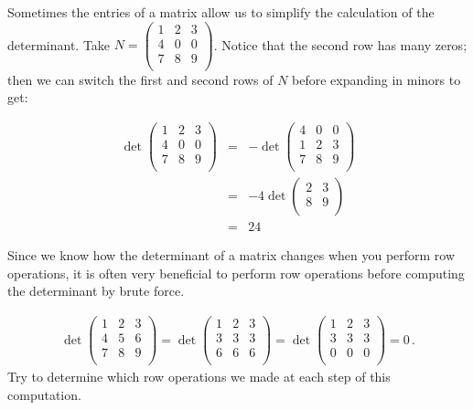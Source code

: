 \begin{example}
Sometimes the entries of a matrix allow us to simplify the calculation of the determinant.  Take $N= \begin{pmatrix}
1 & 2 & 3 \\
4 & 0 & 0 \\
7 & 8 & 9 \\
\end{pmatrix}$.  Notice that the second row has many zeros; then we can switch the first and second rows of $N$ before expanding in minors to get:

\begin{eqnarray*}
\det \begin{pmatrix}
1 & 2 & 3 \\
4 & 0 & 0 \\
7 & 8 & 9 \\
\end{pmatrix} & = & -\det \begin{pmatrix}
4 & 0 & 0 \\
1 & 2 & 3 \\
7 & 8 & 9 \\
\end{pmatrix}\\
&=& -4 \det \begin{pmatrix}
2 & 3 \\
8 & 9 \\
\end{pmatrix} \\
&=& 24
\end{eqnarray*}
\end{example}
 

Since we know how the determinant of a matrix changes when you perform row operations, it is often very beneficial to perform row
operations before computing the determinant by brute force.

\begin{example}
\begin{eqnarray*}
\det\begin{pmatrix}
1 & 2 & 3 \\
4 & 5 & 6 \\
7 & 8 & 9 \\
\end{pmatrix}
=
\det\begin{pmatrix}
1 & 2 & 3 \\
3 & 3 & 3 \\
6 & 6 & 6 \\
\end{pmatrix}
=
\det\begin{pmatrix}
1 & 2 & 3 \\
3 & 3 & 3 \\
0 & 0 & 0 \\
\end{pmatrix}=0\, .
\end{eqnarray*}
Try to determine which row operations we made at each step of this computation.
\end{example}

